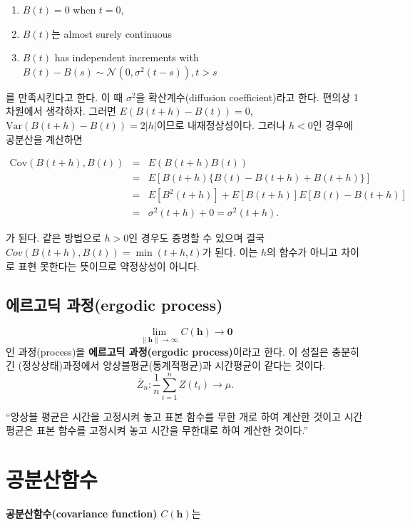 \documentclass[b5paper,]{book}
\providecommand{\tightlist}{%
  \setlength{\itemsep}{0pt}\setlength{\parskip}{0pt}}
\theoremstyle{definition}
\theoremstyle{definition}
\theoremstyle{definition}
\theoremstyle{remark}
\begin{document}
\begin{enumerate}
\def\labelenumi{\arabic{enumi}.}
\tightlist
\item
  \(B(t)=0\) when \(t=0\),
\item
  \(B(t)\)는 almost surely continuous
\item
  \(B(t)\) has independent increments with
  \(B(t)-B(s) \sim \mathcal{N}(0,\sigma^{2}(t-s)), t>s\)
\end{enumerate}

를 만족시킨다고 한다. 이 때 \(\sigma^{2}\)을 확산계수(diffusion
coefficient)라고 한다. 편의상 1차원에서 생각하자. 그러면
\(E(B(t+h)-B(t))=0\), \(\text{Var}(B(t+h)-B(t))=2|h|\)이므로
내재정상성이다. 그러나 \(h < 0\)인 경우에 공분산을 계산하면

\begin{eqnarray}
\text{Cov}(B(t+h),B(t)) &=& E(B(t+h)B(t))\nonumber\\
&=&E[B(t+h)\{B(t)-B(t+h)+B(t+h)\}]\nonumber\\
&=&E[B^{2}(t+h)]+E[B(t+h)]E[B(t)-B(t+h)]\nonumber\\
&=&\sigma^{2}(t+h)+0=\sigma^{2}(t+h).
\end{eqnarray}

가 된다. 같은 방법으로 \(h > 0\)인 경우도 증명할 수 있으며 결국
\(Cov(B(t+h),B(t))=\min (t+h,t)\)가 된다. 이는 \(h\)의 함수가 아니고
차이로 표현 못한다는 뜻이므로 약정상성이 아니다.

\section{에르고딕 과정(ergodic process)}\label{-ergodic-process}

\[\lim_{\|\mathbf{h}\| \rightarrow \infty}C(\mathbf{h}) \rightarrow \mathbf{0}\]
인 과정(process)을 \textbf{에르고딕 과정(ergodic process)}이라고 한다.
이 성질은 충분히 긴 (정상상태)과정에서 앙상블평균(통계적평균)과
시간평균이 같다는 것이다.
\[\bar{Z}_{n}:\frac{1}{n}\sum_{i=1}^{n}Z(t_{i}) \rightarrow \mu .\]

``앙상블 평균은 시간을 고정시켜 놓고 표본 함수를 무한 개로 하여 계산한
것이고 시간평균은 표본 함수를 고정시켜 놓고 시간을 무한대로 하여 계산한
것이다.''

\chapter{공분산함수}\label{covfct}

\textbf{공분산함수(covariance function)} \(C(\mathbf{h})\)는
\end{document}

